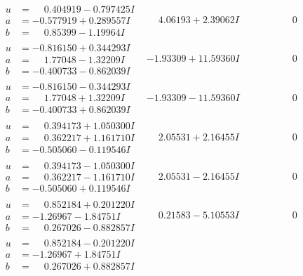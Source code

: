 \documentclass[1p]{elsarticle_modified}
\theoremstyle{definition}
\begin{document}
$$\begin{array}{c|c|c}
\begin{aligned}
u &= \phantom{-}0.404919 - 0.797425 I \\
a &= -0.577919 + 0.289557 I \\
b &= \phantom{-}0.85399 - 1.19964 I\end{aligned}
 & \phantom{-}4.06193 + 2.39062 I & \phantom{-0.000000 } 0 \\ \hline\begin{aligned}
u &= -0.816150 + 0.344293 I \\
a &= \phantom{-}1.77048 - 1.32209 I \\
b &= -0.400733 - 0.862039 I\end{aligned}
 & -1.93309 + 11.59360 I & \phantom{-0.000000 } 0 \\ \hline\begin{aligned}
u &= -0.816150 - 0.344293 I \\
a &= \phantom{-}1.77048 + 1.32209 I \\
b &= -0.400733 + 0.862039 I\end{aligned}
 & -1.93309 - 11.59360 I & \phantom{-0.000000 } 0 \\ \hline\begin{aligned}
u &= \phantom{-}0.394173 + 1.050300 I \\
a &= \phantom{-}0.362217 + 1.161710 I \\
b &= -0.505060 - 0.119546 I\end{aligned}
 & \phantom{-}2.05531 + 2.16455 I & \phantom{-0.000000 } 0 \\ \hline\begin{aligned}
u &= \phantom{-}0.394173 - 1.050300 I \\
a &= \phantom{-}0.362217 - 1.161710 I \\
b &= -0.505060 + 0.119546 I\end{aligned}
 & \phantom{-}2.05531 - 2.16455 I & \phantom{-0.000000 } 0 \\ \hline\begin{aligned}
u &= \phantom{-}0.852184 + 0.201220 I \\
a &= -1.26967 - 1.84751 I \\
b &= \phantom{-}0.267026 - 0.882857 I\end{aligned}
 & \phantom{-}0.21583 - 5.10553 I & \phantom{-0.000000 } 0 \\ \hline\begin{aligned}
u &= \phantom{-}0.852184 - 0.201220 I \\
a &= -1.26967 + 1.84751 I \\
b &= \phantom{-}0.267026 + 0.882857 I\end{aligned}

\end{array}$$
\end{document}
